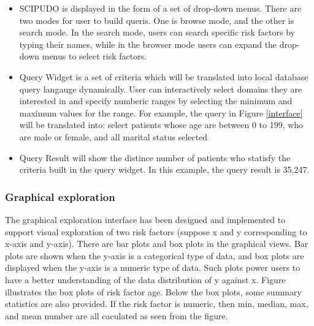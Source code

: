 \documentclass{amia}
\begin{document}
\vspace{-3mm}
\begin{itemize}
\setlength\itemsep{0em}
  \item SCIPUDO is displayed in the form of a set of drop-down menus. There are two modes for user to build queris. One is browse mode, and the other is search mode. In the search mode, users can search specific risk factors by typing their names, while in the browser mode users can expand the drop-down menus to select risk factors.
  \item Query Widget is a set of criteria which will be translated into local database query langauge dynamically. User can interactively select domains they are interested in and specify numberic ranges by selecting the minimum and maximum values for the range. For example, the query in Figure \ref{interface} will be translated into: select patients whose age are between 0 to 199, who are male or female, and all marital status selected
  \item Query Result will show the distince number of patients who statisfy the criteria built in the query widget. In this example, the query result is 35,247.
\end{itemize}
\vspace{-3mm}

\subsubsection{Graphical exploration}
The graphical exploration interface has been designed and implemented to support visual exploration of two risk factors (suppose x and y corresponding to x-axis and y-axis). There are bar plots and box plots in the graphical views. Bar plots are shown when the y-axis is a categorical type of data, and box plots are displayed when the y-axis is a numeric type of data. Such plots power users to have a better understanding of the data distribution of y against x. Figure ~\cite{graphical} illustrates the box plots of risk factor age. Below the box plots, some summary statistics are also provided. If the risk factor is numeric, then min, median, max, and mean number are all caculated as seen from the figure.
\end{document}
